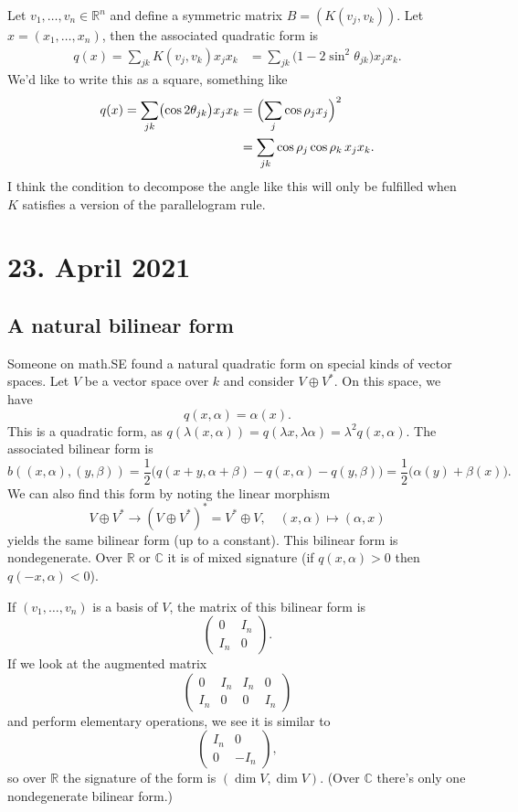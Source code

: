 \documentclass[11pt]{article}
\theoremstyle{definition}
\newcommand{\kk}[1]{\mathbb{#1}}
\begin{document}
Let $v_1, \ldots, v_n \in \kk R^n$ and define a symmetric matrix $B = (K(v_j, v_k))$. Let $x = (x_1, \ldots, x_n)$, then the associated quadratic form is
\begin{align*}
q(x)
= \sum_{jk} K(v_j, v_k) x_j x_k
&= \sum_{jk} \bigl(
1 - 2 \sin^2 \theta_{jk}
\bigr) x_j x_k.
\end{align*}
We'd like to write this as a square, something like
\begin{align*}
q(x) = \sum_{jk} \bigl(\cos 2\theta_{jk} \bigr) x_j x_k
&= \Bigl(\sum_{j} \cos \rho_jx_j \Bigr)^2
\\
&= \sum_{jk} \cos \rho_j\cos \rho_k \, x_j x_k.
\end{align*}
I think the condition to decompose the angle like this will only be fulfilled when $K$ satisfies a version of the parallelogram rule.


\section*{23. April 2021}

\subsection*{A natural bilinear form}

Someone on math.SE found a natural quadratic form on special kinds of vector spaces. Let $V$ be a vector space over $k$ and consider $V \oplus V^*$. On this space, we have
\[
q(x, \alpha) = \alpha(x).
\]
This is a quadratic form, as $q(\lambda(x,\alpha)) = q(\lambda x, \lambda\alpha) = \lambda^2 q(x, \alpha)$. The associated bilinear form is
\[
b((x, \alpha), (y, \beta))
= \frac12\bigl(q(x + y, \alpha + \beta) - q(x, \alpha) - q(y,\beta)\bigr)
= \frac12 \bigl(\alpha(y) + \beta(x)\bigr).
\]
We can also find this form by noting the linear morphism
\[
V \oplus V^* \to (V \oplus V^*)^* = V^* \oplus V,
\quad
(x, \alpha) \mapsto (\alpha, x)
\]
yields the same bilinear form (up to a constant). This bilinear form is nondegenerate. Over $\kk R$ or $\kk C$ it is of mixed signature (if $q(x,\alpha) > 0$ then $q(-x,\alpha) < 0$).

If $(v_1, \ldots, v_n)$ is a basis of $V$, the matrix of this bilinear form is
\[
\begin{pmatrix}
0 & I_n \\
I_n & 0
\end{pmatrix}.
\]
If we look at the augmented matrix
\[
\begin{pmatrix}
0 & I_n & I_n & 0 \\
I_n & 0 & 0 & I_n
\end{pmatrix}
\]
and perform elementary operations, we see it is similar to
\[
\begin{pmatrix}
I_n & 0 \\
0 & -I_n
\end{pmatrix},
\]
so over $\kk R$ the signature of the form is $(\dim V, \dim V)$. (Over $\kk C$ there's only one nondegenerate bilinear form.)
\end{document}
